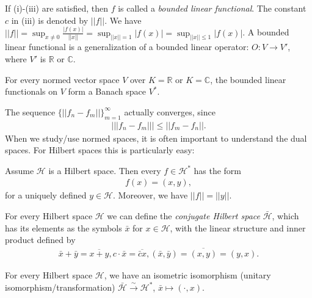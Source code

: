 If (i)-(iii) are satisfied, then \(f\) is called a \emph{bounded linear functional}. The constant \(c\) in (iii) is denoted by \(||f||\).
We have \(||f||=\sup_{x\neq0} \frac{|f(x)|}{||x||} = \sup_{||x||=1} |f(x)| = \sup_{||x||\leq 1}|f(x)|\). A bounded linear functional is a generalization of a bounded linear operator: \(O:V\rightarrow V'\), where \(V'\) is \(\mathbb{R}\) or \(\mathbb{C}\). 

\begin{proposition}
    For every normed vector space \(V\) over \(K=\mathbb{R}\) or \(K=\mathbb{C}\), the bounded linear functionals on \(V\) form a 
    Banach space \(V^*\).
\end{proposition}
\begin{remark}
    The sequence \(\{||f_n - f_m ||\}^{\infty}_{m=1}\) actually converges, since
    \begin{align*}
        \Big\vert ||f_n-f_m|| \Big\vert \leq ||f_m-f_n||.
    \end{align*}
    When we study/use normed spaces, it is often important to understand the dual spaces. For Hilbert spaces this is particularly easy:
\end{remark}
\begin{theorem}
    Assume \(\mathcal{H}\) is a Hilbert space. Then every \(f\in\mathcal{H}^*\) has the form 
    \begin{align*}
        f(x) = (x,y),
    \end{align*}
    for a uniquely defined \(y\in\mathcal{H}\). Moreover, we have \(||f||=||y||\).
\end{theorem}

For every Hilbert space \(\mathcal{H}\) we can define the \emph{conjugate Hilbert space} \(\bar{\mathcal{H}}\), which has its elements as 
the symbols \(\bar{x}\) for \(x\in\mathcal{H}\), with the linear structure and inner product defined by 
\begin{align*}
    \bar{x} + \bar{y} = \overline{x+y}, c\cdot \bar{x} = \overline{\bar{c}x}, (\bar{x}, \bar{y}) = \overline{(x,y)} = (y,x).
\end{align*}
\begin{corollary}
    For every Hilbert space \(\mathcal{H}\), we have an isometric isomorphism (unitary isomorphism/transformation) \(\bar{\mathcal{H}} \xrightarrow[ ]{ \sim} \mathcal{H}^*\), 
    \(\bar{x}\mapsto (\cdot, x)\).
\end{corollary}
